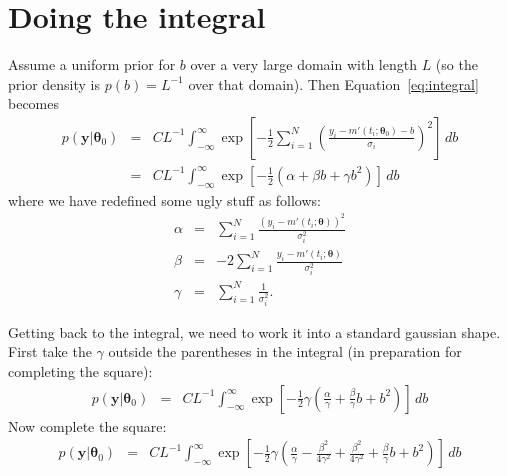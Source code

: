 \documentclass[a4paper, 11pt]{article}
\newcommand{\yy}{\boldsymbol{y}}	%
\newcommand{\btheta}{\boldsymbol{\theta}}  %
\begin{document}
\section{Doing the integral}
Assume a uniform prior for $b$ over a very large domain with length
$L$ (so the prior density is $p(b) = L^{-1}$ over that domain). Then
Equation~\ref{eq:integral} becomes
\begin{eqnarray}
p(\yy | \btheta_0) &=& CL^{-1}\int_{-\infty}^\infty
\exp\left[
-\frac{1}{2}\sum_{i=1}^N
\left(\frac{y_i - m'(t_i; \btheta_0) - b}{\sigma_i}
\right)^2
\right]
\, db \\
&=&
CL^{-1}\int_{-\infty}^\infty
\exp\left[
-\frac{1}{2}
\left(\alpha + \beta b + \gamma b^2\right)
\right]
\, db
\end{eqnarray}
where we have redefined some ugly stuff as follows:
\begin{eqnarray}
\alpha &=& \sum_{i=1}^N \frac{\left(y_i - m'(t_i; \btheta)\right)^2}{\sigma_i^2}\\
\beta  &=& -2\sum_{i=1}^N\frac{y_i - m'(t_i; \btheta)}{\sigma_i^2}\\
\gamma &=& \sum_{i=1}^N \frac{1}{\sigma_i^2}.
\end{eqnarray}

Getting back to the integral, we need to work it into a standard gaussian shape.
First take the $\gamma$ outside the parentheses in the integral (in preparation
for completing the square):
\begin{eqnarray}
p(\yy | \btheta_0) &=&
CL^{-1}\int_{-\infty}^\infty
\exp\left[
-\frac{1}{2}\gamma
\left(\frac{\alpha}{\gamma} + \frac{\beta}{\gamma} b + b^2\right)
\right]
\, db
\end{eqnarray}
Now complete the square:
\begin{eqnarray}
p(\yy | \btheta_0) &=&
CL^{-1}\int_{-\infty}^\infty
\exp\left[
-\frac{1}{2}\gamma
\left(\frac{\alpha}{\gamma} - \frac{\beta^2}{4\gamma^2} + \frac{\beta^2}{4\gamma^2} + \frac{\beta}{\gamma} b + b^2\right)
\right]
\, db
\end{eqnarray}
\end{document}
